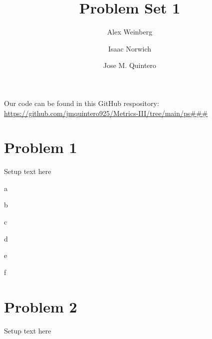\documentclass{article}
\title{Problem Set 1}
\author{Alex Weinberg \and Isaac Norwich \and Jose M. Quintero}
\begin{document}
\maketitle

Our code can be found in this GitHub respository: \url{https://github.com/jmquintero925/Metrics-III/tree/main/ps###}


\section*{Problem 1}
Setup text here

\begin{problem}{a}
\end{problem}
\begin{solution}
\end{solution}

\begin{problem}{b}
\end{problem}
\begin{solution}
\end{solution}

\begin{problem}{c}
\end{problem}
\begin{solution}
\end{solution}

\begin{problem}{d}
\end{problem}
\begin{solution}
\end{solution}

\begin{problem}{e}
\end{problem}
\begin{solution}
\end{solution}

\begin{problem}{f}
\end{problem}
\begin{solution}
\end{solution}

\newpage
\section*{Problem 2}
Setup text here
\end{document}
